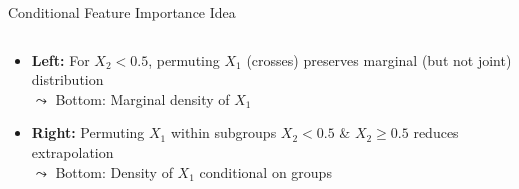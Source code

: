 \documentclass[11pt,compress,t,notes=noshow, aspectratio=169, xcolor=table]{beamer}
\begin{document}
\begin{frame}{Conditional Feature Importance Idea}
{\begin{columns}[T, totalwidth = \linewidth]
\begin{column}{0.52\textwidth}
\begin{itemize}
    \item \textbf{Left:} For $X_2<0.5$, permuting $X_1$ (crosses) preserves marginal (but not joint) distribution \\
    $\leadsto$ Bottom: Marginal density of $X_1$
    \item \textbf{Right:} Permuting $X_1$ within subgroups $X_2<0.5$ \& $X_2\geq 0.5$ reduces extrapolation\\
    $\leadsto$ Bottom: Density of $X_1$ conditional on groups
\end{itemize}
\end{column}
\end{columns}
}
\end{frame}
\end{document}
